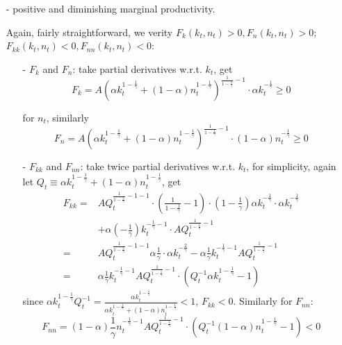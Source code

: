 \documentclass[10pt,landscape,a4paper]{article}
\begin{document}
\begin{multicols*}{4}
\begin{itemize}
    \item[-] positive and diminishing marginal productivity.
    
    Again, fairly straightforward, we verity $F_k(k_t,n_t)>0, F_n(k_t,n_t)>0$; $F_{kk}(k_t,n_t)<0,F_{nn}(k_t,n_t)<0$:
    \begin{itemize}
        \item[-] $F_k$ and $F_n$: take partial derivatives w.r.t. $k_t$, get
        $$
        F_k=A\left(\alpha k_t^{1-\frac{1}{\gamma}}+(1-\alpha)n_t^{1-\frac{1}{\gamma}}\right)^{\frac{1}{1-\frac{1}{\gamma}}-1}\cdot\alpha k_t^{-\frac{1}{\gamma}}\geq 0
        $$
        
        for $n_t$, similarly
        $$
        F_n=A\left(\alpha k_t^{1-\frac{1}{\gamma}}+(1-\alpha)n_t^{1-\frac{1}{\gamma}}\right)^{\frac{1}{1-\frac{1}{\gamma}}-1}\cdot(1-\alpha) n_t^{-\frac{1}{\gamma}}\geq 0
        $$
        
        \item[-] $F_{kk}$ and $F_{nn}$: take twice partial derivatives w.r.t. $k_t$, for simplicity, again let $Q_t\equiv \alpha k_t^{1-\frac{1}{\gamma}}+(1-\alpha)n_t^{1-\frac{1}{\gamma}}$, get
        \begin{align*}
            F_{kk} =& AQ_t^{\frac{1}{1-\frac{1}{\gamma}}-1-1}\cdot\left(\frac{1}{1-\frac{1}{\gamma}}-1\right)\cdot\left(1-\frac{1}{\gamma}\right)\alpha k_t^{-\frac{1}{\gamma}}\cdot \alpha k_t^{-\frac{1}{\gamma}}\\
            &+ \alpha\left(-\frac{1}{\gamma}\right)k_t^{-\frac{1}{\gamma}-1}\cdot AQ_t^{\frac{1}{1-\frac{1}{\gamma}}-1}\\
            =& AQ_t^{\frac{1}{1-\frac{1}{\gamma}}-1-1}\alpha \frac{1}{\gamma}\cdot \alpha k_t^{-\frac{2}{\gamma}}-\alpha\frac{1}{\gamma}k_t^{-\frac{1}{\gamma}-1}AQ_t^{\frac{1}{1-\frac{1}{\gamma}}-1}\\
            =& \alpha \frac{1}{\gamma}k_t^{-\frac{1}{\gamma}-1}AQ_t^{\frac{1}{1-\frac{1}{\gamma}}-1}\cdot \left( Q_t^{-1}\alpha k_t^{1-\frac{1}{\gamma}} -1\right)
        \end{align*}
        since $\alpha k_t^{1-\frac{1}{\gamma}}Q_t^{-1}=\frac{\alpha k_t^{1-\frac{1}{\gamma}}}{\alpha k_t^{1-\frac{1}{\gamma}}+(1-\alpha) n_t^{1-\frac{1}{\gamma}}}<1$, $F_{kk}<0$. Similarly for $F_{nn}$:
        $$
            F_{nn} = (1-\alpha) \frac{1}{\gamma}n_t^{-\frac{1}{\gamma}-1}AQ_t^{\frac{1}{1-\frac{1}{\gamma}}-1}\cdot \left( Q_t^{-1}(1-\alpha) n_t^{1-\frac{1}{\gamma}} -1\right)<0
        $$
        

\end{itemize}
\end{itemize}
\end{multicols*}
\end{document}
